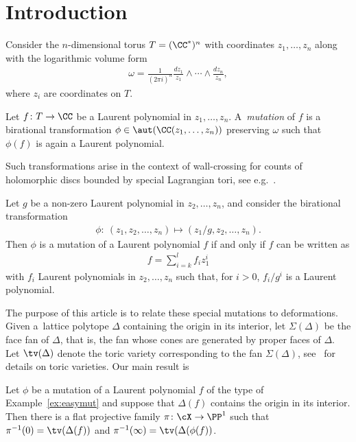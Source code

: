 \section{Introduction}
Consider the $n$-dimensional torus $T=(\CC^*)^n$ with coordinates $z_1,\ldots,z_n$ along with the logarithmic volume form
\begin{gather*}
\omega=\frac{1}{(2\pi i)^n}\frac{d z_1}{z_1}\wedge \cdots \wedge \frac{d z_n}{z_n},
\end{gather*}
where $z_i$ are coordinates on $T$.
\begin{Definition}
	Let $f\colon T\to\CC$ be a Laurent polynomial in $z_1,\ldots,z_n$.
	A~\emph{mutation} of $f$ is a birational transformation $\phi\in\aut(\CC(z_1,\ldots,z_n))$
preserving $\omega$ such that $\phi(f)$ is again a Laurent polynomial.
\end{Definition}

 Such  transformations arise in the context of wall-crossing for counts of holomorphic discs bounded by special Lagrangian tori, see e.g.~\cite{auroux}.

\begin{Example}\label{ex:easymut}
Let $g$ be a non-zero Laurent polynomial in $z_2,\ldots,z_n$, and consider the birational transformation
\begin{gather*}	
	\phi: \ (z_1,z_2,\ldots,z_n)\mapsto (z_1/g,z_2,\ldots,z_n).
\end{gather*}
Then $\phi$ is a mutation of a Laurent polynomial $f$ if and only if $f$ can be written as
\begin{gather*}
f=\sum_{i=k}^l f_i z_1^i
\end{gather*}
with $f_i$ Laurent polynomials in $z_2,\ldots,z_n$ such that, for $i>0$, $f_i/g^i$ is a Laurent polynomial.
\end{Example}

The purpose of this article is to relate these special mutations to deformations. Given a~lattice polytope $\Delta$ containing the origin in its interior, let
$\Sigma(\Delta)$ be the face fan of $\Delta$, that is, the fan whose cones are generated by proper faces of $\Delta$. Let $\tv(\Delta)$ denote the toric variety corresponding to the fan $\Sigma(\Delta)$, see~\cite{fulton:93a} for details on toric varieties.  Our main result is

\begin{Theorem}\label{thm:main}
	Let $\phi$ be a mutation of a Laurent polynomial $f$ of the type of Example~{\rm \ref{ex:easymut}} and suppose that $\Delta(f)$ contains the origin in its interior. Then there is a flat projective family $\pi\colon \cX\to\PP^1$ such that $\pi^{-1}(0)=\tv(\Delta(f))$ and $\pi^{-1}(\infty)=\tv(\Delta(\phi(f))$.
\end{Theorem}


